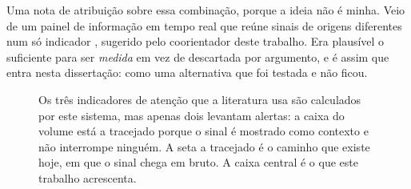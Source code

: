 Uma nota de atribuição sobre essa combinação, porque a ideia não é minha. Veio de um painel de
informação em tempo real que reúne sinais de origens diferentes num só indicador \autocite{worldmonitor2026}, sugerido pelo coorientador deste trabalho. Era plausível o suficiente
para ser \emph{medida} em vez de descartada por argumento, e é assim que entra nesta dissertação:
como uma alternativa que foi testada e não ficou.

\begin{figure}[ht]
\centering
{}
\caption[Da atenção à decisão]{Os três indicadores de atenção que a literatura usa
\autocite{barber2008glitters} são calculados por este sistema, mas apenas dois levantam alertas: a
caixa do volume está a tracejado porque o sinal é mostrado como contexto e não interrompe ninguém. A
seta a tracejado é o caminho que existe hoje, em que o sinal chega em bruto. A caixa central é o que
este trabalho acrescenta.}
\label{fig:ctx_atencao}
\end{figure}

